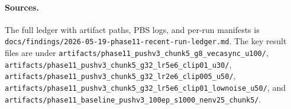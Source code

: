 \paragraph{Sources.}
The full ledger with artifact paths, PBS logs, and per-run manifests is \texttt{docs/findings/2026-05-19-phase11-recent-run-ledger.md}.  The key result files are under \texttt{artifacts/phase11\_pushv3\_chunk5\_g8\_vecasync\_u100/}, \texttt{artifacts/phase11\_pushv3\_chunk5\_g32\_lr5e6\_clip01\_u30/}, \texttt{artifacts/phase11\_pushv3\_chunk5\_g32\_lr2e6\_clip005\_u50/}, \texttt{artifacts/phase11\_pushv3\_chunk5\_g32\_lr5e6\_clip01\_lownoise\_u50/}, and \texttt{artifacts/phase11\_baseline\_pushv3\_100ep\_s1000\_nenv25\_chunk5/}.
